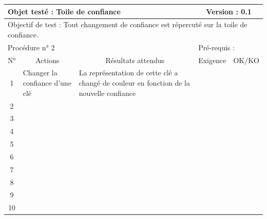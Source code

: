 \documentclass{../res/univ-projet}
\begin{document}
\begin{center}
    \begin{tabular}{|c|p{5cm}|p{5cm}|p{1.5cm}|p{1.5cm}|}
      \hline
      \multicolumn{3}{|l|}{Objet testé : Toile de confiance} & \multicolumn{2}{c|}{Version : 0.1}\\ \hline
      \multicolumn{5}{|l|}{Objectif de test : Tout changement de confiance est répercuté sur la toile de confiance.}\\ \hline
      \multicolumn{3}{|l|}{Procédure n° 2} & \multicolumn{2}{p{3cm}|}{Pré-requis : }\\ \hline
      \multicolumn{1}{|c|}{N°} & \multicolumn{1}{c|}{Actions} & \multicolumn{1}{c|}{Résultats attendus} & 
      \multicolumn{1}{c|}{Exigence} & \multicolumn{1}{c|}{OK/KO}\\ \hline
      1 & Changer la confiance d'une clé & La représentation de cette clé a changé de couleur en fonction de la nouvelle confiance &  & \\
      2 &  &  &  & \\
      3 &  &  &  & \\ 
	  4 &  &  &  & \\
      5 &  &  &  & \\
	  6 &  &  &  & \\
      7 &  &  &  & \\
      8 &  &  &  & \\
      9 &  &  &  & \\
      10 &  &  &  &\\ 
	\hline
    \end{tabular}
    \vskip 2.2cm




\end{center}
\end{document}
